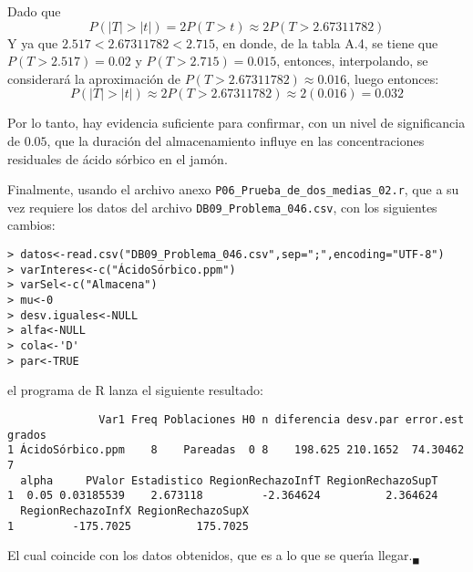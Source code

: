 \begin{solucion}
 \begin{valorp}
  Dado que
  \begin{equation*}
   P\left( |T| > |t| \right) = 2P(T > t)
   \approx 2P(T > 2.67311782)
  \end{equation*}
  Y ya que $2.517 < 2.67311782 < 2.715$,
  en donde, de la tabla A.4, se tiene que $P(T > 2.517) = 0.02$
  y $P(T > 2.715) = 0.015$,
  entonces, interpolando, se considerar\'a la aproximaci\'on
  de $P(T > 2.67311782) \approx 0.016$, luego entonces:
  \begin{equation*}
   P\left( |T| > |t| \right) \approx 2P(T > 2.67311782) \approx 2(0.016) = 0.032
  \end{equation*}
 \end{valorp}

 \begin{conclusion}
  Por lo tanto, hay evidencia suficiente
  para confirmar, con un nivel de significancia de $0.05$,
  que la duraci\'on del almacenamiento influye
  en las concentraciones residuales de \'acido s\'orbico
  en el jam\'on.
 \end{conclusion}

 Finalmente, usando el archivo anexo
 \texttt{P06\_Prueba\_de\_dos\_medias\_02.r},
 que a su vez requiere los datos del archivo
 \texttt{DB09\_Problema\_046.csv},
 con los siguientes cambios:
 \begin{verbatim}
> datos<-read.csv("DB09_Problema_046.csv",sep=";",encoding="UTF-8")
> varInteres<-c("ÁcidoSórbico.ppm")
> varSel<-c("Almacena")
> mu<-0
> desv.iguales<-NULL
> alfa<-NULL
> cola<-'D'
> par<-TRUE
 \end{verbatim}
 \vspace{-0.5cm}
 el programa de R lanza el siguiente resultado:
 \begin{verbatim}
              Var1 Freq Poblaciones H0 n diferencia desv.par error.est grados
1 ÁcidoSórbico.ppm    8    Pareadas  0 8    198.625 210.1652  74.30462      7
  alpha     PValor Estadistico RegionRechazoInfT RegionRechazoSupT
1  0.05 0.03185539    2.673118         -2.364624          2.364624
  RegionRechazoInfX RegionRechazoSupX
1         -175.7025          175.7025
 \end{verbatim}
 \vspace{-0.5cm}
 El cual coincide con los datos obtenidos,
 que es a lo que se quer\'{\i}a llegar.${}_{\blacksquare}$
\end{solucion}
